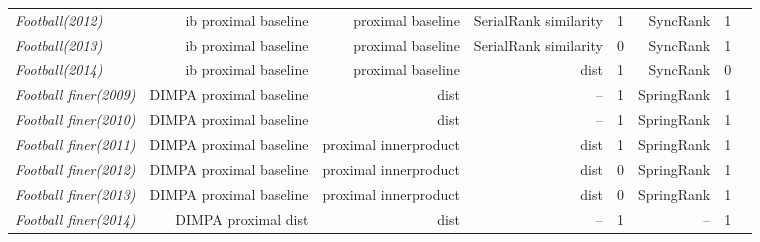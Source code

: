 \documentclass[nohyperref]{article}
\theoremstyle{plain}
\theoremstyle{definition}
\theoremstyle{remark}
\begin{document}
\begin{table*}[!ht]
{\begin{tabular}{lrrrrrrr}
			{\it Football(2012)} & ib proximal baseline & proximal baseline & SerialRank similarity & 1 & SyncRank & 1 \\
			{\it Football(2013)} & ib proximal baseline & proximal baseline & SerialRank similarity & 0 & SyncRank & 1 \\
			{\it Football(2014)} & ib proximal baseline & proximal baseline & dist & 1 & SyncRank & 0 \\
			{\it Football finer(2009)} & DIMPA proximal baseline & dist & -- & 1 & SpringRank & 1 \\
			{\it Football finer(2010)} & DIMPA proximal baseline & dist & -- & 1 & SpringRank & 1 \\
			{\it Football finer(2011)} & DIMPA proximal baseline & proximal innerproduct & dist & 1 & SpringRank & 1 \\
			{\it Football finer(2012)} & DIMPA proximal baseline & proximal innerproduct & dist & 0 & SpringRank & 1 \\
			{\it Football finer(2013)} & DIMPA proximal baseline & proximal innerproduct & dist & 0 & SpringRank & 1 \\
			{\it Football finer(2014)} & DIMPA proximal dist & dist & -- & 1 & -- & 1 \\
\bottomrule
\end{tabular}}
\end{table*}
\end{document}
